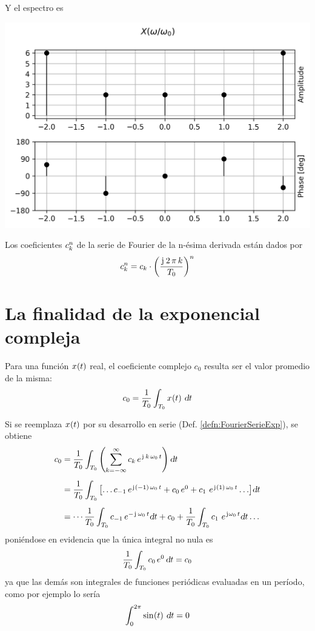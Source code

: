 \begin{mdframed}[style=ExampleFrame]
    Y el espectro es
    \begin{center}
        \includegraphics[width=\linewidth]{./images/ej_serie_fourier.png}
    \end{center}
\end{mdframed}

\begin{mdframed}[style=PropertyFrame]
    \begin{prop}
    \end{prop}
    Los coeficientes $c_\kth^\nth$ de la serie de Fourier de la n-ésima derivada están dados por
    \[
        c_\kth^\nth = c_\kth \cdot \inParentheses{\frac{\iu \, 2 \, \pi \, \kth}{T_0}}^\nth
    \]
\end{mdframed}

\section{La finalidad de la exponencial compleja}

Para una función $\fx[x]{t}$ real, el coeficiente complejo $c_0$ resulta ser el valor promedio de la misma:
\[
    c_0 = \frac{1}{T_0} \int_{T_0} \fx[x]{t} \, \dif t
\]

Si se reemplaza $\fx[x]{t}$ por su desarrollo en serie (Def. \ref{defn:FourierSerieExp}), se obtiene
\begin{align}
    c_0
    &= \frac{1}{T_0} \int_{T_0} \inParentheses{\sum_{\kth=-\infty}^\infty c_\kth \, e^{\iu \, \kth \, \omega_0 \, t}} \dif t
    \notag
    \\[1ex]
    &= \frac{1}{T_0} \int_{T_0} \inBrackets{\dots c_{-1} \, e^{\iu \inParentheses{-1} \, \omega_0 \, t} + c_0 \, e^0 + c_1 \, \, e^{\iu \inParentheses{1} \, \omega_0 \, t} \dots} \dif t
    \label{eqn:coeficientes}
    \\[1ex]
    &= \cdots \frac{1}{T_0} \int_{T_0} c_{-1} \, e^{- \iu \, \omega_0 \, t} \dif t
    + c_0
    + \frac{1}{T_0} \int_{T_0} c_1 \, \, e^{\iu \omega_0 \, t} \dif t \dots
    \notag
\end{align}
poniéndose en evidencia que la única integral no nula es
\[
    \frac{1}{T_0} \int_{T_0} c_0 \, e^0 \, \dif t = c_0
\]
ya que las demás son integrales de funciones periódicas evaluadas en un período, como por ejemplo lo sería
\[
    \int_0^{2\pi} \fx[\sin]{t} \, \dif t = 0
\]

